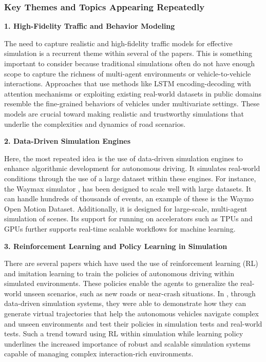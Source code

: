\documentclass[lettersize,journal]{IEEEtran}
\newcommand{\subsubsubsection}[1]{%
    \par\medskip
    \noindent\textbf{#1}
    \par\medskip
}
\begin{document}
\subsubsection{Key Themes and Topics Appearing Repeatedly}

\subsubsubsection{1. High-Fidelity Traffic and Behavior Modeling}
The need to capture realistic and high-fidelity traffic models for effective simulation is a recurrent theme within several of the papers. This is something important to consider because traditional simulations often do not have enough scope to capture the richness of multi-agent environments or vehicle-to-vehicle interactions.
Approaches that use methods like LSTM encoding-decoding with attention mechanisms \cite{ref2} or exploiting existing real-world datasets in public domains \cite{ref4} resemble the fine-grained behaviors of vehicles under multivariate settings.
These models are crucial toward making realistic and trustworthy simulations that underlie the complexities and dynamics of road scenarios.
\\
\subsubsubsection{2. Data-Driven Simulation Engines}
Here, the most repeated idea is the use of data-driven simulation engines to enhance algorithmic development for autonomous driving. It simulates real-world conditions through the use of a large dataset within these engines.
For instance, the Waymax simulator \cite{ref4}, has been designed to scale well with large datasets. It can handle hundreds of thousands of events, an example of these is the Waymo Open Motion Dataset. Additionally, it is designed for large-scale, multi-agent simulation of scenes. Its support for running on accelerators such as TPUs and GPUs further supports real-time scalable workflows for machine learning.
\\
\subsubsubsection{3. Reinforcement Learning and Policy Learning in Simulation}
There are several papers which have used the use of reinforcement learning (RL) and imitation learning to train the policies of autonomous driving within simulated environments. These policies enable the agents to generalize the real-world unseen scenarios, such as new roads or near-crash situations.
In \cite{ref3}, through data-driven simulation systems, they were able to demonstrate how they can generate virtual trajectories that help the autonomous vehicles navigate complex and unseen environments and test their policies in simulation tests and real-world tests.
Such a trend toward using RL within simulation while learning policy underlines the increased importance of robust and scalable simulation systems capable of managing complex interaction-rich environments.
\end{document}
